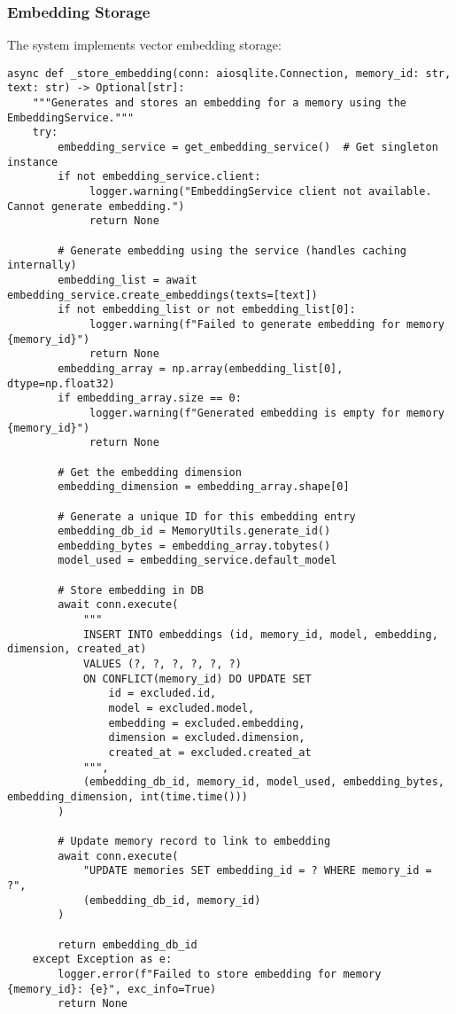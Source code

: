 \documentclass[12pt,a4paper]{article}
\begin{document}
\subsubsection*{Embedding Storage}

The system implements vector embedding storage:
\begin{pageablecode}
\begin{verbatim}
async def _store_embedding(conn: aiosqlite.Connection, memory_id: str, text: str) -> Optional[str]:
    """Generates and stores an embedding for a memory using the EmbeddingService."""
    try:
        embedding_service = get_embedding_service()  # Get singleton instance
        if not embedding_service.client:
             logger.warning("EmbeddingService client not available. Cannot generate embedding.")
             return None

        # Generate embedding using the service (handles caching internally)
        embedding_list = await embedding_service.create_embeddings(texts=[text])
        if not embedding_list or not embedding_list[0]:
             logger.warning(f"Failed to generate embedding for memory {memory_id}")
             return None
        embedding_array = np.array(embedding_list[0], dtype=np.float32)
        if embedding_array.size == 0:
             logger.warning(f"Generated embedding is empty for memory {memory_id}")
             return None

        # Get the embedding dimension
        embedding_dimension = embedding_array.shape[0]

        # Generate a unique ID for this embedding entry
        embedding_db_id = MemoryUtils.generate_id()
        embedding_bytes = embedding_array.tobytes()
        model_used = embedding_service.default_model

        # Store embedding in DB
        await conn.execute(
            """
            INSERT INTO embeddings (id, memory_id, model, embedding, dimension, created_at)
            VALUES (?, ?, ?, ?, ?, ?)
            ON CONFLICT(memory_id) DO UPDATE SET
                id = excluded.id,
                model = excluded.model,
                embedding = excluded.embedding,
                dimension = excluded.dimension,
                created_at = excluded.created_at
            """,
            (embedding_db_id, memory_id, model_used, embedding_bytes, embedding_dimension, int(time.time()))
        )

        # Update memory record to link to embedding
        await conn.execute(
            "UPDATE memories SET embedding_id = ? WHERE memory_id = ?",
            (embedding_db_id, memory_id)
        )

        return embedding_db_id
    except Exception as e:
        logger.error(f"Failed to store embedding for memory {memory_id}: {e}", exc_info=True)
        return None
\end{verbatim}
\end{pageablecode}
\end{document}
